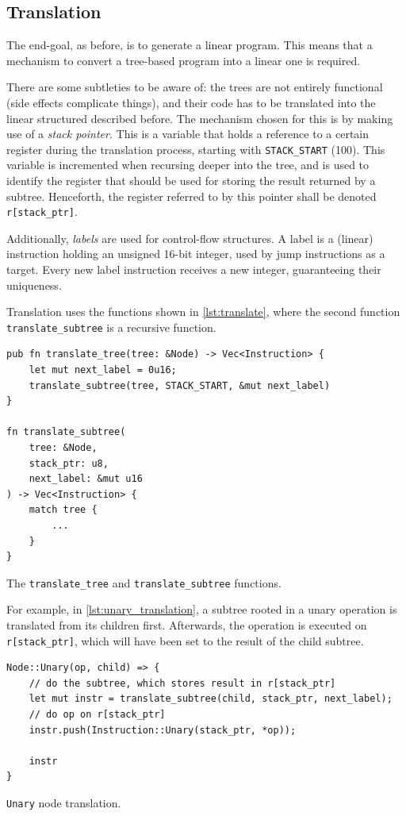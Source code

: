 \documentclass{report}
\newenvironment{code}{\captionsetup{type=listing}}{}
\begin{document}
\subsection{Translation}
The end-goal, as before, is to generate a linear program. This means that a mechanism to convert a tree-based program into a linear one is required.

There are some subtleties to be aware of: the trees are not entirely functional (side effects complicate things), and their code has to be translated into the linear structured described before. The mechanism chosen for this is by making use of a \emph{stack pointer}. This is a variable that holds a reference to a certain register during the translation process, starting with \verb|STACK_START| (100). This variable is incremented when recursing deeper into the tree, and is used to identify the register that should be used for storing the result returned by a subtree. Henceforth, the register referred to by this pointer shall be denoted \verb|r[stack_ptr]|.

Additionally, \emph{labels} are used for control-flow structures. A label is a (linear) instruction holding an unsigned 16-bit integer, used by jump instructions as a target. Every new label instruction receives a new integer, guaranteeing their uniqueness.

Translation uses the functions shown in \autoref{lst:translate}, where the second function \verb|translate_subtree| is a recursive function.

\begin{code}
    \begin{verbatim}
pub fn translate_tree(tree: &Node) -> Vec<Instruction> {
    let mut next_label = 0u16;
    translate_subtree(tree, STACK_START, &mut next_label)
}

fn translate_subtree(
    tree: &Node,
    stack_ptr: u8,
    next_label: &mut u16
) -> Vec<Instruction> {
    match tree {
        ...
    }
}
    \end{verbatim}
    \caption{The \texttt{translate\_tree} and \texttt{translate\_subtree} functions.}
    \label{lst:translate}
\end{code}

For example, in \autoref{lst:unary_translation}, a subtree rooted in a unary operation is translated from its children first. Afterwards, the operation is executed on \verb|r[stack_ptr]|, which will have been set to the result of the child subtree.

\begin{code}
    \begin{verbatim}
Node::Unary(op, child) => {
    // do the subtree, which stores result in r[stack_ptr]
    let mut instr = translate_subtree(child, stack_ptr, next_label);
    // do op on r[stack_ptr]
    instr.push(Instruction::Unary(stack_ptr, *op));

    instr
}
    \end{verbatim}
    \caption{\texttt{Unary} node translation.}
    \label{lst:unary_translation}
\end{code}
\end{document}
